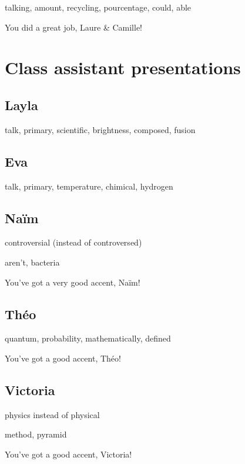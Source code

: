 \documentclass[12pt,oneside]{report}
\begin{document}
\begin{spacing}{1.2}
talking, amount, recycling, pourcentage, could, able

\color{blue}
You did a great job, Laure \& Camille!
\color{black}


\section{Class assistant presentations}



\subsection*{Layla}

talk, primary, scientific, brightness, composed, fusion

\subsection*{Eva}

talk, primary, temperature, chimical, hydrogen

\subsection*{Naïm}

\color{blue}
controversial (instead of controversed)
\color{black}

aren't, bacteria

\color{blue}
You've got a very good accent, Naïm!
\color{black}

\subsection*{Théo}


quantum, probability, mathematically, defined

\color{blue}
You've got a good accent, Théo!
\color{black}


\subsection*{Victoria}

\color{blue}
physics instead of physical
\color{black}

method, pyramid

\color{blue}
You've got a good accent, Victoria!
\color{black}

\end{spacing}
\end{document}
